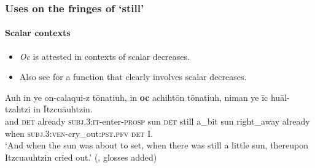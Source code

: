 \subsubsection{Uses on the fringes of \lq{}still\rq{}}
\paragraph{Scalar contexts}\label{appendixClassicalNahuatlScalar}
\begin{itemize}
	\item \textit{Oc} is attested in contexts of scalar decreases.
	\item Also see  for a function that clearly involves scalar decreases.
\end{itemize}

\begin{exe}
	\ex
	\gll Auh in ye on-calaqui-z tōnatiuh, in \textbf{oc} achihtōn tōnatiuh, niman ye īc huāl-tzahtzi in Ītzcuāuhtzin.\\
and \textsc{det} already \textsc{subj}.3:\textsc{it}-enter-\textsc{prosp} sun \textsc{det} still a\_bit sun right\_away already when \textsc{subj}.3:\textsc{ven}-cry\_out:\textsc{pst}.\textsc{pfv} \textsc{det} I.\\
\glt \lq And when the sun was about to set, when there was still a little sun, thereupon Itzcuauhtzin cried out.\rq{ }(\cite[609]{Andrews2003}, glosses added)

\end{exe}

